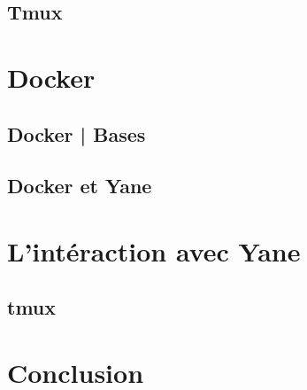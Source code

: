 \documentclass{article}
\begin{document}
		\subsection{Tmux}
		\newpage
	\section{Docker}
		\subsection{Docker | Bases}
		\subsection{Docker et Yane}
		\subsection{}
		\newpage
	\section{L'intéraction avec Yane}
		\subsection{tmux}
		\newpage
	\section{Conclusion}
\end{document}
